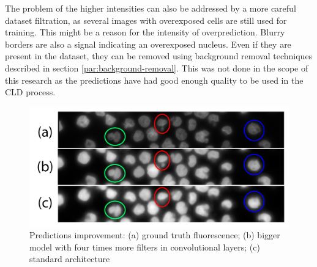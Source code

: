 The problem of the higher intensities can also be addressed by a more careful dataset filtration, as several images with overexposed cells are still used for training. This might be a reason for the intensity of overprediction. Blurry borders are also a signal indicating an overexposed nucleus. Even if they are present in the dataset, they can be removed using background removal techniques described in section \ref{par:background-removal}. This was not done in the scope of this research as the predictions have had good enough quality to be used in the CLD process.

\begin{figure}[H]
	\begin{center}
		\includegraphics[width=0.6\linewidth]{bilder/nuclei/bigger-model.png}
		\caption{Predictions improvement: (a) ground truth fluorescence; (b) bigger model with four times more filters in convolutional layers; (c) standard architecture}\label{fig:better-nuclei}
	\end{center}
\end{figure}
